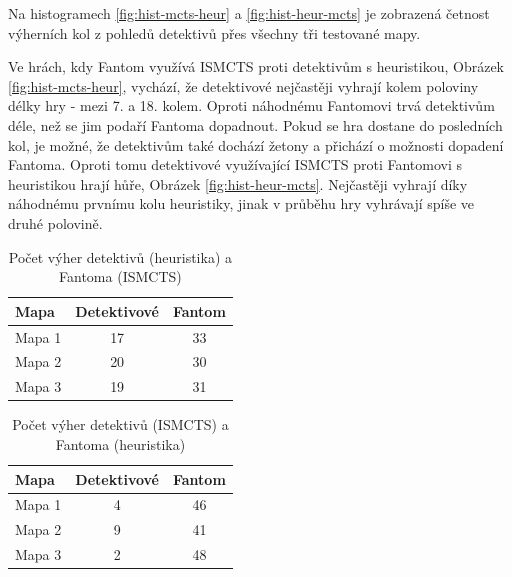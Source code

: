 Na histogramech \ref{fig:hist-mcts-heur} a \ref{fig:hist-heur-mcts} je zobrazená četnost výherních kol z pohledů detektivů přes všechny tři testované mapy. 

Ve hrách, kdy Fantom využívá ISMCTS proti detektivům s heuristikou, Obrázek \ref{fig:hist-mcts-heur}, vychází, že detektivové nejčastěji vyhrají kolem poloviny délky hry - mezi 7. a 18. kolem. Oproti náhodnému Fantomovi trvá detektivům déle, než se jim podaří Fantoma dopadnout. Pokud se hra dostane do posledních kol, je možné, že detektivům také dochází žetony a přichází o možnosti dopadení Fantoma. Oproti tomu detektivové využívající ISMCTS proti Fantomovi s heuristikou hrají hůře, Obrázek \ref{fig:hist-heur-mcts}. Nejčastěji vyhrají díky náhodnému prvnímu kolu heuristiky, jinak v průběhu hry vyhrávají spíše ve druhé polovině.

\begin{table}[htbp]
    \centering
    \caption{Počet výher detektivů (heuristika) a Fantoma (ISMCTS)}
    \label{tab:mcts-heur}
    \begin{tabular}{@{}lcc@{}}
        \toprule
        \textbf{Mapa} & \textbf{Detektivové} & \textbf{Fantom} \\
        \midrule
        Mapa 1 & 17 & 33 \\
        Mapa 2 & 20 & 30 \\
        Mapa 3 & 19 & 31 \\
        \bottomrule
    \end{tabular}
\end{table}

\begin{table}[htbp]
    \centering
    \caption{Počet výher detektivů (ISMCTS) a Fantoma (heuristika)}
    \label{tab:heur-mcts}
    \begin{tabular}{@{}lcc@{}}
        \toprule
        \textbf{Mapa} & \textbf{Detektivové} & \textbf{Fantom} \\
        \midrule
        Mapa 1 & 4 & 46 \\
        Mapa 2 & 9 & 41 \\
        Mapa 3 & 2 & 48 \\
        \bottomrule
    \end{tabular}
\end{table}


